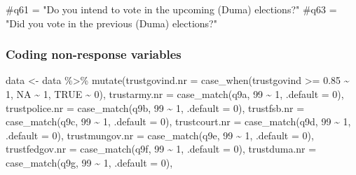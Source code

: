\documentclass[
  letterpaper,
  DIV=11,
  numbers=noendperiod]{scrartcl}
\newenvironment{Shaded}{\begin{snugshade}}{\end{snugshade}}
\newcommand{\AttributeTok}[1]{\textcolor[rgb]{0.40,0.45,0.13}{#1}}
\newcommand{\CommentTok}[1]{\textcolor[rgb]{0.37,0.37,0.37}{#1}}
\newcommand{\ConstantTok}[1]{\textcolor[rgb]{0.56,0.35,0.01}{#1}}
\newcommand{\DecValTok}[1]{\textcolor[rgb]{0.68,0.00,0.00}{#1}}
\newcommand{\FloatTok}[1]{\textcolor[rgb]{0.68,0.00,0.00}{#1}}
\newcommand{\FunctionTok}[1]{\textcolor[rgb]{0.28,0.35,0.67}{#1}}
\newcommand{\NormalTok}[1]{\textcolor[rgb]{0.00,0.23,0.31}{#1}}
\newcommand{\OtherTok}[1]{\textcolor[rgb]{0.00,0.23,0.31}{#1}}
\newcommand{\SpecialCharTok}[1]{\textcolor[rgb]{0.37,0.37,0.37}{#1}}
\begin{document}
\begin{Shaded}
\begin{Highlighting}[]
\CommentTok{\#q61 = "Do you intend to vote in the upcoming (Duma) elections?"}
\CommentTok{\#q63 = "Did you vote in the previous (Duma) elections?"}
\end{Highlighting}
\end{Shaded}

\subsubsection{Coding non-response
variables}\label{coding-non-response-variables}

\begin{Shaded}
\begin{Highlighting}[]
\NormalTok{data }\OtherTok{\textless{}{-}}\NormalTok{ data }\SpecialCharTok{\%\textgreater{}\%} 
  \FunctionTok{mutate}\NormalTok{(}\AttributeTok{trustgovind.nr =} \FunctionTok{case\_when}\NormalTok{(trustgovind }\SpecialCharTok{\textgreater{}=} \FloatTok{0.85} \SpecialCharTok{\textasciitilde{}} \DecValTok{1}\NormalTok{, }\ConstantTok{NA} \SpecialCharTok{\textasciitilde{}} \DecValTok{1}\NormalTok{, }\ConstantTok{TRUE} \SpecialCharTok{\textasciitilde{}} \DecValTok{0}\NormalTok{),}
         \AttributeTok{trustarmy.nr =} \FunctionTok{case\_match}\NormalTok{(q9a, }\DecValTok{99} \SpecialCharTok{\textasciitilde{}} \DecValTok{1}\NormalTok{, }\AttributeTok{.default =} \DecValTok{0}\NormalTok{),}
         \AttributeTok{trustpolice.nr =} \FunctionTok{case\_match}\NormalTok{(q9b, }\DecValTok{99} \SpecialCharTok{\textasciitilde{}} \DecValTok{1}\NormalTok{, }\AttributeTok{.default =} \DecValTok{0}\NormalTok{),}
         \AttributeTok{trustfsb.nr =} \FunctionTok{case\_match}\NormalTok{(q9c, }\DecValTok{99} \SpecialCharTok{\textasciitilde{}} \DecValTok{1}\NormalTok{, }\AttributeTok{.default =} \DecValTok{0}\NormalTok{),}
         \AttributeTok{trustcourt.nr =} \FunctionTok{case\_match}\NormalTok{(q9d, }\DecValTok{99} \SpecialCharTok{\textasciitilde{}} \DecValTok{1}\NormalTok{, }\AttributeTok{.default =} \DecValTok{0}\NormalTok{),}
         \AttributeTok{trustmungov.nr =} \FunctionTok{case\_match}\NormalTok{(q9e, }\DecValTok{99} \SpecialCharTok{\textasciitilde{}} \DecValTok{1}\NormalTok{, }\AttributeTok{.default =} \DecValTok{0}\NormalTok{),}
         \AttributeTok{trustfedgov.nr =} \FunctionTok{case\_match}\NormalTok{(q9f, }\DecValTok{99} \SpecialCharTok{\textasciitilde{}} \DecValTok{1}\NormalTok{, }\AttributeTok{.default =} \DecValTok{0}\NormalTok{),}
         \AttributeTok{trustduma.nr =} \FunctionTok{case\_match}\NormalTok{(q9g, }\DecValTok{99} \SpecialCharTok{\textasciitilde{}} \DecValTok{1}\NormalTok{, }\AttributeTok{.default =} \DecValTok{0}\NormalTok{),}

\end{Highlighting}
\end{Shaded}
\end{document}
